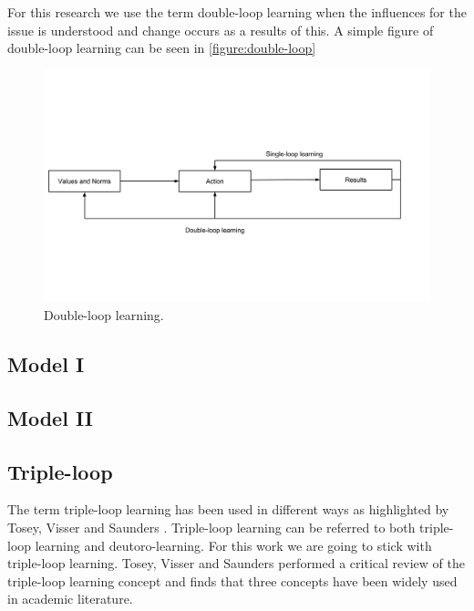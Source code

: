 For this research we use the term double-loop learning when the influences for the issue is understood and change occurs as a results of this. A simple figure of double-loop learning can be seen in \autoref{figure:double-loop}

\begin{figure}[!h]
	\centering
	\includegraphics[width=\textwidth, keepaspectratio]{figures/double-loop.png}
	\caption{Double-loop learning.}
	\label{figure:double-loop}
\end{figure}

\subsection{Model I} %
\label{sub:model_i}

\subsection{Model II} %
\label{sub:organizational_learning_ii}

\subsection{Triple-loop} %
\label{sub:triple_loop}
The term triple-loop learning has been used in different ways as highlighted by Tosey, Visser and Saunders \cite{Tosey2011}. Triple-loop learning can be referred to both triple-loop learning and deutoro-learning. For this work we are going to stick with triple-loop learning. Tosey, Visser and Saunders performed a critical review of the triple-loop learning concept and finds that three concepts have been widely used in academic literature. 

